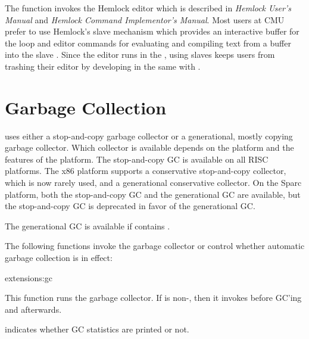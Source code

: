 The  function invokes the Hemlock editor which is described
in {\it Hemlock User's Manual} and {\it Hemlock Command Implementor's
Manual}. Most users at CMU prefer to use Hemlock's slave \llisp{}
mechanism which provides an interactive buffer for the
 loop and editor commands for evaluating and
compiling text from a buffer into the slave \llisp.  Since the editor
runs in the \llisp, using slaves keeps users from trashing their
editor by developing in the same \llisp{} with \hemlock{}.


\section{Garbage Collection}

\cmucl{} uses either a stop-and-copy garbage collector or a
generational, mostly copying garbage collector.  Which collector is
available depends on the platform and the features of the platform.
The stop-and-copy GC is available on all RISC platforms.  The x86
platform supports a conservative stop-and-copy collector, which is now
rarely used, and a generational conservative collector.  On the Sparc
platform, both the stop-and-copy GC and the generational GC are
available, but the stop-and-copy GC is deprecated in favor of the
generational GC.  

The generational GC is available if  contains
.


The following functions invoke the garbage collector or control whether
automatic garbage collection is in effect:

\begin{defun}[-cheney]{extensions:}{gc}{}
  
  This function runs the garbage collector.  If
   is non-\nil, then it invokes
   before GC'ing and
   afterwards.
  
   indicates whether GC statistics are printed or
  not. 

\end{defun}

